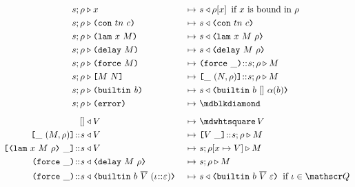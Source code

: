 \begin{figure}[H]
  \begin{subfigure}[c]{\linewidth}

    \begin{minipage}{\linewidth}
\begin{alignat*}{2}
 s;\rho & \compute x                                 &~\mapsto~& s \return  \rho[x] \enskip \mbox{if $x$ is bound in $\rho$}\\
 s;\rho & \compute \con{tn}{c}                       &~\mapsto~& s \return \VCon{tn}{c}\\
 s;\rho & \compute \lamU{x}{M}                       &~\mapsto~& s \return \VLamAbs{x}{M}{\rho}\\
 s;\rho & \compute \delay{M}                         &~\mapsto~& s\return \VDelay{M}{\rho}\\
 s;\rho & \compute \force{M}                         &~\mapsto~& \inForceFrame{} \cons s;\rho \compute M \\
 s;\rho & \compute \appU{M}{N}                       &~\mapsto~& \inAppLeftFrame{(N,\rho)} \cons s ;\rho \compute M\\
 s;\rho & \compute \builtin{b}                      &~\mapsto~& s \return \VBuiltin{b}{[]}{\arity{b}}\\
 s;\rho & \compute \errorU                           &~\mapsto~& \cekerror{}\\
\\[-10pt] %
[] & \return V                                    &~\mapsto~& \cekhalt{V}\\
\inAppLeftFrame{(M,\rho)}  \cons s            & \return V  &~\mapsto~& \inAppRightFrame{V} \cons s;\rho \compute M\\
\inAppRightFrame{\VLamAbs{x}{M}{\rho}} \cons s   & \return V  &~\mapsto~& s;\rho[x \mapsto V] \compute M\\
\inForceFrame{} \cons s & \return \VDelay{M}{\rho}         &~\mapsto~& s;\rho \compute M\\
\inForceFrame{} \cons s & \return \VBuiltin{b}{\repetition{V}}{(\iota \cons \varepsilon)} &~\mapsto~&
                         s \return \VBuiltin{b}{\repetition{V}}{\varepsilon} \enskip \mbox{if $\iota \in \QVar$}\\

\end{alignat*}
\end{minipage}
\end{subfigure}
\end{figure}
